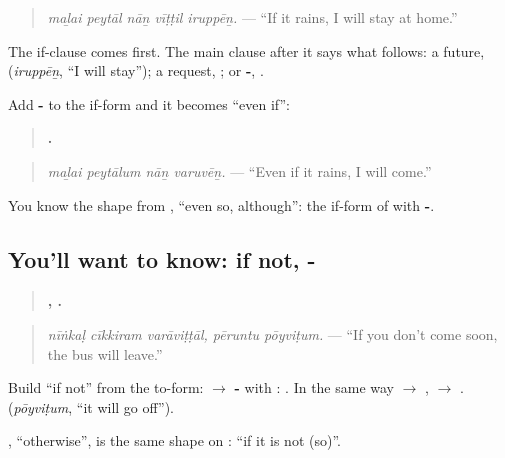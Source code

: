 \begin{quote}
\emph{maḻai peytāl nāṉ vīṭṭil iruppēṉ.} — \textquotedblleft{}If it rains, I will stay at home.\textquotedblright{}
\end{quote}

The if-clause comes first. The main clause after it says what follows: a future, \textbf{} (\emph{iruppēṉ}, \textquotedblleft{}I will stay\textquotedblright{}); a request, \textbf{}; or \textbf{-}, \textbf{}.

Add \textbf{-} to the if-form and it becomes \textquotedblleft{}even if\textquotedblright{}:

\begin{quote}
\textbf{   .}
\end{quote}

\begin{quote}
\emph{maḻai peytālum nāṉ varuvēṉ.} — \textquotedblleft{}Even if it rains, I will come.\textquotedblright{}
\end{quote}

You know the shape from \textbf{}, \textquotedblleft{}even so, although\textquotedblright{}: the if-form of \textbf{} with \textbf{-}.

\subsection*{You'll want to know: if not, -}
\begin{quote}
\textbf{  ,  .}
\end{quote}

\begin{quote}
\emph{nīṅkaḷ cīkkiram varāviṭṭāl, pēruntu pōyviṭum.} — \textquotedblleft{}If you don't come soon, the bus will leave.\textquotedblright{}
\end{quote}

Build \textquotedblleft{}if not\textquotedblright{} from the to-form: \textbf{} $\to$ \textbf{-} with \textbf{}: \textbf{}. In the same way \textbf{} $\to$ \textbf{}, \textbf{} $\to$ \textbf{}. \textbf{} (\emph{pōyviṭum}, \textquotedblleft{}it will go off\textquotedblright{}).

\textbf{}, \textquotedblleft{}otherwise\textquotedblright{}, is the same shape on \textbf{}: \textquotedblleft{}if it is not (so)\textquotedblright{}.

